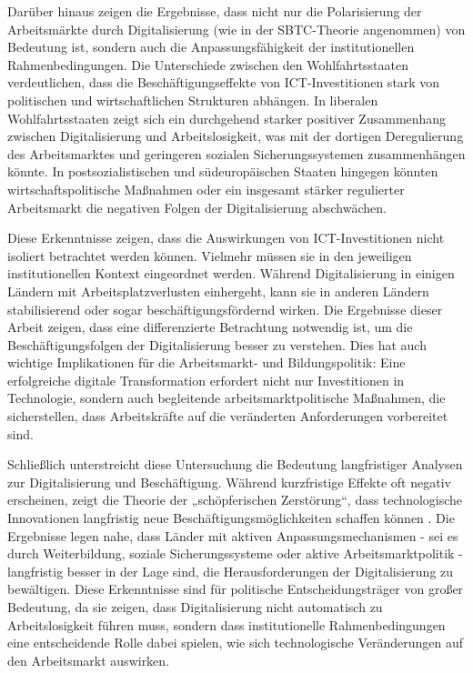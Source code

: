 Darüber hinaus zeigen die Ergebnisse, dass nicht nur die Polarisierung der 
Arbeitsmärkte durch Digitalisierung (wie in der \ac{SBTC}-Theorie angenommen) von 
Bedeutung ist, sondern auch die Anpassungsfähigkeit der institutionellen 
Rahmenbedingungen. Die Unterschiede zwischen den Wohlfahrtsstaaten verdeutlichen, dass 
die Beschäftigungseffekte von \ac{ICT}-Investitionen stark von politischen und 
wirtschaftlichen Strukturen abhängen. In liberalen Wohlfahrtsstaaten zeigt sich ein 
durchgehend starker positiver Zusammenhang zwischen Digitalisierung und 
Arbeitslosigkeit, was mit der dortigen Deregulierung des Arbeitsmarktes und geringeren 
sozialen Sicherungssystemen zusammenhängen könnte. In postsozialistischen und 
südeuropäischen Staaten hingegen könnten wirtschaftspolitische Maßnahmen oder ein 
insgesamt stärker regulierter Arbeitsmarkt die negativen Folgen der Digitalisierung 
abschwächen.

Diese Erkenntnisse zeigen, dass die Auswirkungen von \ac{ICT}-Investitionen nicht 
isoliert betrachtet werden können. Vielmehr müssen sie in den jeweiligen 
institutionellen Kontext eingeordnet werden. Während Digitalisierung in einigen Ländern 
mit Arbeitsplatzverlusten einhergeht, kann sie in anderen Ländern stabilisierend oder 
sogar beschäftigungsfördernd wirken. Die Ergebnisse dieser Arbeit zeigen, dass eine 
differenzierte Betrachtung notwendig ist, um die Beschäftigungsfolgen der Digitalisierung 
besser zu verstehen. Dies hat auch wichtige Implikationen für die Arbeitsmarkt- und 
Bildungspolitik: Eine erfolgreiche digitale Transformation erfordert nicht nur 
Investitionen in Technologie, sondern auch begleitende arbeitsmarktpolitische Maßnahmen, 
die sicherstellen, dass Arbeitskräfte auf die veränderten Anforderungen vorbereitet sind.

Schließlich unterstreicht diese Untersuchung die Bedeutung langfristiger Analysen zur 
Digitalisierung und Beschäftigung. Während kurzfristige Effekte oft negativ erscheinen, 
zeigt die Theorie der „schöpferischen Zerstörung“, dass technologische Innovationen 
langfristig neue Beschäftigungsmöglichkeiten schaffen können 
\parencite[vgl.][S. 103-105]{schumpeter1976capitalism}. Die Ergebnisse legen nahe, dass 
Länder mit aktiven Anpassungsmechanismen - sei es durch Weiterbildung, soziale 
Sicherungssysteme oder aktive Arbeitsmarktpolitik - langfristig besser in der Lage sind, 
die Herausforderungen der Digitalisierung zu bewältigen. Diese Erkenntnisse sind für 
politische Entscheidungsträger von großer Bedeutung, da sie zeigen, dass Digitalisierung 
nicht automatisch zu Arbeitslosigkeit führen muss, sondern dass institutionelle 
Rahmenbedingungen eine entscheidende Rolle dabei spielen, wie sich technologische 
Veränderungen auf den Arbeitsmarkt auswirken.


